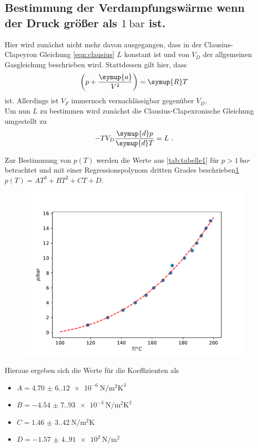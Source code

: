 \subsection{Bestimmung der Verdampfungswärme wenn der Druck größer als $\qty{1}{\bar}$ ist.}

Hier wird zunächst nicht mehr davon ausgegangen, dass in der Clausius-Clapeyron Gleichung \ref{eqn:clausius} $L$ konstant ist
und von $V_D$ der allgemeinen Gasgleichung beschrieben wird. Stattdessen gilt hier, dass
\begin{equation}
    \left(p+\frac{\symup{a}}{V^2}\right)=\symup{R}T
    \label{eqn:vd}
\end{equation}
ist. Allerdings ist $V_F$ immernoch vernachlässigbar gegenüber $V_D$.\\
Um nun $L$ zu bestimmen wird zunächst die Clausius-Clapexronische Gleichung umgestellt zu
\begin{equation}
    -TV_D\frac{\symup{d}p}{\symup{d}T}=L \text{ .}
    \label{eqn:claus}
\end{equation}

Zur Bestimmung von $p(T)$ werden die Werte aus \ref{tab:tabelle1} für $p>\qty{1}{bar}$ betrachtet und mit einer 
Regressionspolynom dritten Grades beschrieben\ref{fig:druck2} $p(T)=AT^3+BT^2+CT+D$.

\begin{figure}[H]
    \centering
    \includegraphics{plot2.pdf}
    \label{fig:druck2}
\end{figure}

Hieraus ergeben sich die Werte für die Koeffizienten als
\begin{itemize}
    \item $A=\qty{4.70(6.12)e-6}{\newton\per\meter\squared\kelvin\cubed}$
    \item $B=\qty{-4.54(7.93)e-3}{\newton\per\meter\squared\kelvin\squared}$
    \item $C=\qty{1.46(3.42)}{\newton\per\meter\squared\kelvin}$
    \item $D=\qty{-1.57(4.91)e2}{\newton\per\meter\squared}$
\end{itemize}

